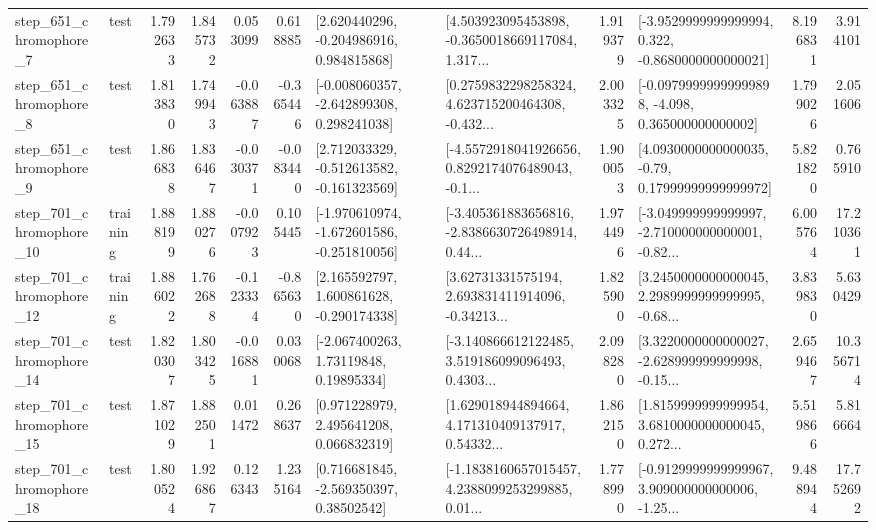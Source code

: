 \begin{tabular}{llrrrrllrlrr}
   step\_651\_chromophore\_7 &      test &      1.792633 &    1.845732 &      0.053099 &  0.618885 &    [2.620440296, -0.204986916, 0.984815868] &  [4.503923095453898, -0.3650018669117084, 1.317... &       1.919379 &  [-3.9529999999999994, 0.322, -0.8680000000000021] &            8.196831 &          3.914101 \\
   step\_651\_chromophore\_8 &      test &      1.813830 &    1.749943 &     -0.063887 & -0.365446 &   [-0.008060357, -2.642899308, 0.298241038] &  [0.2759832298258324, 4.623715200464308, -0.432... &       2.003325 &  [-0.09799999999999898, -4.098, 0.365000000000002] &            1.799026 &          2.051606 \\
   step\_651\_chromophore\_9 &      test &      1.866838 &    1.836467 &     -0.030371 & -0.083440 &   [2.712033329, -0.512613582, -0.161323569] &  [-4.5572918041926656, 0.8292174076489043, -0.1... &       1.900053 &   [4.0930000000000035, -0.79, 0.17999999999999972] &            5.821820 &          0.765910 \\
  step\_701\_chromophore\_10 &  training &      1.888199 &    1.880276 &     -0.007923 &  0.105445 &  [-1.970610974, -1.672601586, -0.251810056] &  [-3.405361883656816, -2.8386630726498914, 0.44... &       1.974496 &  [-3.049999999999997, -2.710000000000001, -0.82... &            6.005764 &         17.210361 \\
  step\_701\_chromophore\_12 &  training &      1.886022 &    1.762688 &     -0.123334 & -0.865630 &    [2.165592797, 1.600861628, -0.290174338] &  [3.62731331575194, 2.693831411914096, -0.34213... &       1.825900 &  [3.2450000000000045, 2.2989999999999995, -0.68... &            3.839830 &          5.630429 \\
  step\_701\_chromophore\_14 &      test &      1.820307 &    1.803425 &     -0.016881 &  0.030068 &      [-2.067400263, 1.73119848, 0.19895334] &  [-3.140866612122485, 3.519186099096493, 0.4303... &       2.098280 &  [3.3220000000000027, -2.628999999999998, -0.15... &            2.659467 &         10.356714 \\
  step\_701\_chromophore\_15 &      test &      1.871029 &    1.882501 &      0.011472 &  0.268637 &     [0.971228979, 2.495641208, 0.066832319] &  [1.629018944894664, 4.171310409137917, 0.54332... &       1.862150 &  [1.8159999999999954, 3.6810000000000045, 0.272... &            5.519866 &          5.816664 \\
  step\_701\_chromophore\_18 &      test &      1.800524 &    1.926867 &      0.126343 &  1.235164 &     [0.716681845, -2.569350397, 0.38502542] &  [-1.1838160657015457, 4.2388099253299885, 0.01... &       1.778990 &  [-0.9129999999999967, 3.909000000000006, -1.25... &            9.488944 &         17.752692 \\

\end{tabular}
